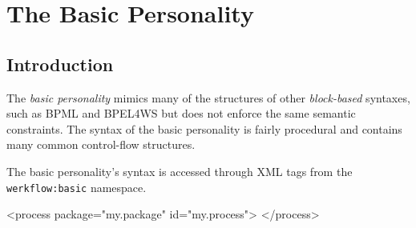 \chapter{The Basic Personality}

\section{Introduction}

The \emph{basic personality} mimics many of the structures
of other \emph{block-based} syntaxes, such as BPML and BPEL4WS
but does not enforce the same semantic constraints.  The syntax of
the basic personality is fairly procedural and contains many common
control-flow structures.

The basic personality's syntax is accessed through XML tags from
the \verb|werkflow:basic| namespace.

\begin{codelisting}
<process 
         package="my.package"
         id="my.process">
</process>
\end{codelisting}




